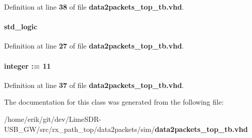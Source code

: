 Definition at line {\bf 38} of file {\bf data2packets\+\_\+top\+\_\+tb.\+vhd}.

\paragraph[{reset\+\_\+n}]{ {\bfseries \textcolor{comment}{std\+\_\+logic}\textcolor{vhdlchar}{ }} \hspace{0.3cm}{\ttfamily [Signal]}}\label{classdata2packets__top__tb_1_1tb__behave_a1f070fd63a3a7fa45c907335ea870c5b}


Definition at line {\bf 27} of file {\bf data2packets\+\_\+top\+\_\+tb.\+vhd}.

\paragraph[{smpl\+\_\+fifo\+\_\+size}]{ {\bfseries \textcolor{comment}{integer}\textcolor{vhdlchar}{ }\textcolor{vhdlchar}{ }\textcolor{vhdlchar}{\+:}\textcolor{vhdlchar}{=}\textcolor{vhdlchar}{ }\textcolor{vhdlchar}{ } \textcolor{vhdldigit}{11} \textcolor{vhdlchar}{ }} \hspace{0.3cm}{\ttfamily [Signal]}}\label{classdata2packets__top__tb_1_1tb__behave_a0c91d64f5066a9fa8b76860d0fbd3ab1}


Definition at line {\bf 37} of file {\bf data2packets\+\_\+top\+\_\+tb.\+vhd}.



The documentation for this class was generated from the following file\+:\begin{DoxyCompactItemize}
\item 
/home/erik/git/dev/\+Lime\+S\+D\+R-\/\+U\+S\+B\+\_\+\+G\+W/src/rx\+\_\+path\+\_\+top/data2packets/sim/{\bf data2packets\+\_\+top\+\_\+tb.\+vhd}\end{DoxyCompactItemize}
